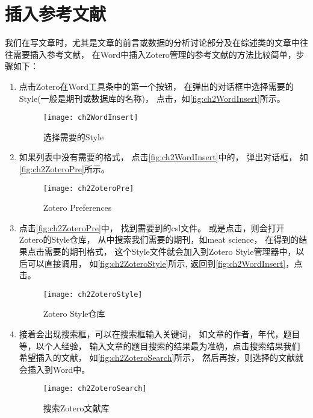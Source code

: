 \documentclass[cn,11pt,chinese]{elegantbook}
\begin{document}
		\section{插入参考文献}\label{sec:insertRef}
		我们在写文章时，尤其是文章的前言或数据的分析讨论部分及在综述类的文章中往往需要插入参考文献，
		在Word中插入Zotero管理的参考文献的方法比较简单，步骤如下：
		\begin{enumerate}
			\item
			点击Zotero在Word工具条中的第一个按钮，
			在弹出的对话框中选择需要的Style(一般是期刊或数据库的名称)，
			点击，如\autoref{fig:ch2WordInsert}所示。
			\begin{figure}[htbp]
				\centering
				\texttt{[image: ch2WordInsert]}
				\caption{选择需要的Style}
				\label{fig:ch2WordInsert}
			\end{figure}
			\item
			如果列表中没有需要的格式\label{tag:notyle}，
			点击\autoref{fig:ch2WordInsert}中的，
			弹出对话框，
			如\autoref{fig:ch2ZoteroPre}所示。
			\begin{figure}[htbp]
				\centering
				\texttt{[image: ch2ZoteroPre]}
				\caption{Zotero Preferences}
				\label{fig:ch2ZoteroPre}
			\end{figure}
			\item
			点击\autoref{fig:ch2ZoteroPre}中\menu{+}，
			找到需要到的csl文件。
			或是点击，则会打开Zotero的Style仓库，
			从中搜索我们需要的期刊，如meat science，
			在得到的结果点击需要的期刊格式，
			这个Style文件就会加入到Zotero Style管理器中，以后可以直接调用，
			如\autoref{fig:ch2ZoteroStyle}所示,
			返回到\autoref{fig:ch2WordInsert}，点击。
			\begin{figure}[htbp]
				\centering
				\texttt{[image: ch2ZoteroStyle]}
				\caption{Zotero Style仓库}
				\label{fig:ch2ZoteroStyle}
			\end{figure}
			\item
			接着会出现搜索框，可以在搜索框输入关键词，
			如文章的作者，年代，题目等，以个人经验，
			输入文章的题目搜索的结果最为准确，点击搜索结果我们希望插入的文献，
			如\autoref{fig:ch2ZoteroSearch}所示，
			然后再按，则选择的文献就会插入到Word中。
			\begin{figure}[htbp]
				\centering
				\texttt{[image: ch2ZoteroSearch]}
				\caption{搜索Zotero文献库}

\end{figure}
\end{enumerate}
\end{document}
